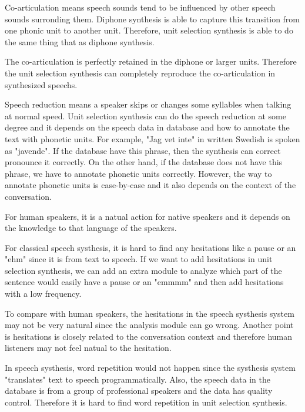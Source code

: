 \documentclass[12pt]{article}
\newenvironment{problem}[2][Problem]{\begin{trivlist}
\item[\hskip \labelsep {\bfseries #1}\hskip \labelsep {\bfseries #2.}]}{\end{trivlist}}
\begin{document}
\begin{problem}{2.2}

    Co-articulation means speech sounds tend to be influenced by other speech
    sounds surronding them.
    Diphone synthesis is able to capture this transition from one phonic unit
    to another unit.
    Therefore, unit selection synthesis is able to do the same thing that as
    diphone synthesis.

    The co-articulation is perfectly retained in the diphone or larger
    units.
    Therefore the unit selection synthesis can completely reproduce
    the co-articulation in synthesized speechs.


    Speech reduction means a speaker skips or changes some syllables when talking
    at normal speed. Unit selection synthesis can do the speech reduction at
    some degree and it depends on the speech data in database and how to annotate
    the text with phonetic units.
    For example, "Jag vet inte" in written Swedish is spoken as "javende". If
    the database have this phrase, then the synthesis can correct pronounce it
    correctly. On the other hand, if the database does not have this phrase,
    we have to annotate phonetic units correctly. However, the way to annotate
    phonetic units is case-by-case and it also depends on the context of the
    conversation.

    For human speakers, it is a natual action for native speakers and it depends
    on the knowledge to that language of the speakers.

    For classical speech systhesis, it is hard to find any hesitations like
    a pause or an "ehm" since it is from text to speech.
    If we want to add hesitations in unit
    selection synthesis, we can add an extra module to analyze which part of the
    sentence would easily have a pause or an "emmmm" and then add hesitations with
    a low frequency.

    To compare with human speakers, the hesitations in the speech systhesis system
    may not be very natural since the analysis module can go wrong. Another point
    is hesitations is closely related to the conversation context and therefore
    human listeners may not feel natual to the hesitation.

    In speech systhesis, word repetition would not happen since the systhesis
    system "translates" text to speech programmatically. Also, the speech data in
    the database is from a group of professional speakers and the data has quality control.
    Therefore it is hard to find word repetition in unit selection synthesis.


\end{problem}
\end{document}
